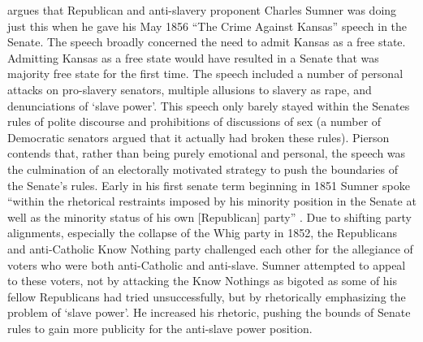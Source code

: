 \documentclass[a4paper]{article}\usepackage[]{graphicx}\usepackage[]{color}
\begin{document}
\cite{Pierson1995} argues that Republican and anti-slavery proponent Charles Sumner was doing just this when he gave his May 1856 ``The Crime Against Kansas'' speech in the Senate. The speech broadly concerned the need to admit Kansas as a free state. Admitting Kansas as a free state would have resulted in a Senate that was majority free state for the first time. The speech included a number of personal attacks on pro-slavery senators, multiple allusions to slavery as rape, and denunciations of `slave power'. This speech only barely stayed within the Senates rules of polite discourse and prohibitions of discussions of sex (a number of Democratic senators argued that it actually had broken these rules). Pierson contends that, rather than being purely emotional and personal, the speech was the culmination of an electorally motivated strategy to push the boundaries of the Senate's rules. Early in his first senate term beginning in 1851 Sumner spoke ``within the rhetorical restraints imposed by his minority position in the Senate at well as the minority status of his own [Republican] party'' \cite[534]{Pierson1995}. Due to shifting party alignments, especially the collapse of the Whig party in 1852, the Republicans and anti-Catholic Know Nothing party challenged each other for the allegiance of voters who were both anti-Catholic and anti-slave. Sumner attempted to appeal to these voters, not by attacking the Know Nothings as bigoted as some of his fellow Republicans had tried unsuccessfully, but by rhetorically emphasizing the problem of `slave power'. He increased his rhetoric, pushing the bounds of Senate rules to gain more publicity for the anti-slave power position.   
\end{document}

